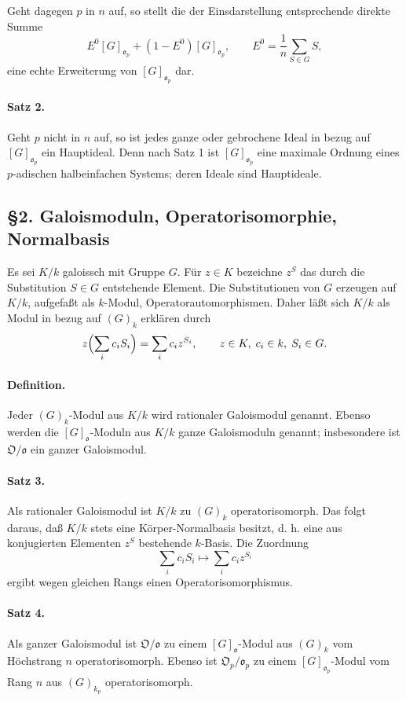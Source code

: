 \documentclass[11pt]{article}
\providecommand{\frako}{\mathfrak o}
\providecommand{\frakO}{\mathfrak O}
\begin{document}
Geht dagegen \(p\) in \(n\) auf, so stellt die der Einsdarstellung entsprechende direkte Summe
\[
        E^0 [G]_{\frako_p}+(1-E^0)[G]_{\frako_p},
        \qquad
        E^0=\frac1n\sum_{S\in G}S,
\]
eine echte Erweiterung von \([G]_{\frako_p}\) dar.

\paragraph{Satz 2.}
Geht \(p\) nicht in \(n\) auf, so ist jedes ganze oder gebrochene Ideal in bezug auf \([G]_{\frako_p}\) ein Hauptideal. Denn nach Satz 1 ist \([G]_{\frako_p}\) eine maximale Ordnung eines \(p\)-adischen halbeinfachen Systems; deren Ideale sind Hauptideale.

\subsection*{§2. Galoismoduln, Operatorisomorphie, Normalbasis}

Es sei \(K/k\) galoissch mit Gruppe \(G\). Für \(z\in K\) bezeichne \(z^S\) das durch die Substitution \(S\in G\) entstehende Element. Die Substitutionen von \(G\) erzeugen auf \(K/k\), aufgefaßt als \(k\)-Modul, Operatorautomorphismen. Daher läßt sich \(K/k\) als Modul in bezug auf \((G)_k\) erklären durch
\[
        z\Bigl(\sum_i c_iS_i\Bigr)=\sum_i c_i z^{S_i},
        \qquad z\in K,\; c_i\in k,\; S_i\in G.
\]

\paragraph{Definition.}
Jeder \((G)_k\)-Modul aus \(K/k\) wird rationaler Galoismodul genannt. Ebenso werden die \([G]_{\frako}\)-Moduln aus \(K/k\) ganze Galoismoduln genannt; insbesondere ist \(\frakO/\frako\) ein ganzer Galoismodul.

\paragraph{Satz 3.}
Als rationaler Galoismodul ist \(K/k\) zu \((G)_k\) operatorisomorph. Das folgt daraus, daß \(K/k\) stets eine Körper-Normalbasis besitzt, d. h. eine aus konjugierten Elementen \(z^S\) bestehende \(k\)-Basis. Die Zuordnung
\[
        \sum_i c_iS_i\longmapsto \sum_i c_i z^{S_i}
\]
ergibt wegen gleichen Rangs einen Operatorisomorphismus.

\paragraph{Satz 4.}
Als ganzer Galoismodul ist \(\frakO/\frako\) zu einem \([G]_{\frako}\)-Modul aus \((G)_k\) vom Höchstrang \(n\) operatorisomorph. Ebenso ist \(\frakO_p/\frako_p\) zu einem \([G]_{\frako_p}\)-Modul vom Rang \(n\) aus \((G)_{k_p}\) operatorisomorph.
\end{document}
